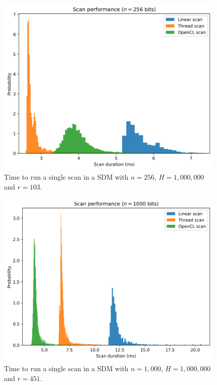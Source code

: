 \begin{figure}[!htb]
\centering\includegraphics[width=\textwidth]{images02/performance/imac-scans-256.png}
\caption{Time to run a single scan in a SDM with $n=256$, $H=1,000,000$ and $r=103$.
\label{fig:perf-imac-scan-256}}
\end{figure}

\begin{figure}[!htb]
\centering\includegraphics[width=\textwidth]{images02/performance/imac-scans-1000.png}
\caption{Time to run a single scan in a SDM with $n=1,000$, $H=1,000,000$ and $r=451$.
\label{fig:perf-imac-scan-1000}}
\end{figure}

